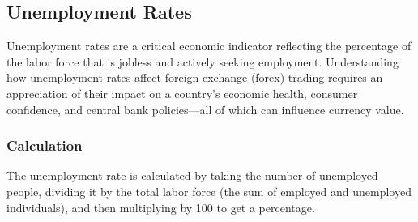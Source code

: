 \documentclass{report}
\begin{document}
     \bigbreak \noindent 
     \subsection{Unemployment Rates}
     \bigbreak \noindent 
     Unemployment rates are a critical economic indicator reflecting the percentage of the labor force that is jobless and actively seeking employment. Understanding how unemployment rates affect foreign exchange (forex) trading requires an appreciation of their impact on a country's economic health, consumer confidence, and central bank policies—all of which can influence currency value.
     \bigbreak \noindent 
     \subsubsection{Calculation}
     \bigbreak \noindent 
     The unemployment rate is calculated by taking the number of unemployed people, dividing it by the total labor force (the sum of employed and unemployed individuals), and then multiplying by 100 to get a percentage. 
     \bigbreak \noindent 

     \bigbreak \noindent 
\end{document}
